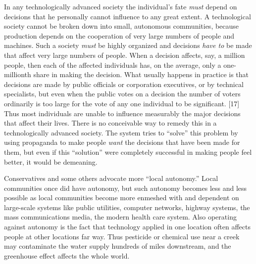  In any technologically advanced society the individual’s fate {\em must} depend on decisions that he personally cannot influence to any great extent. A technological society cannot be broken down into small, autonomous communities, because production depends on the cooperation of very large numbers of people and machines. Such a society {\em must} be highly organized and decisions {\em have to} be made that affect very large numbers of people. When a decision affects, say, a million people, then each of the affected individuals has, on the average, only a one-millionth share in making the decision. What usually happens in practice is that decisions are made by public officials or corporation executives, or by technical specialists, but even when the public votes on a decision the number of voters ordinarily is too large for the vote of any one individual to be significant. [17] Thus most individuals are unable to influence measurably the major decisions that affect their lives. There is no conceivable way to remedy this in a technologically advanced society. The system tries to “solve” this problem by using propaganda to make people {\em want} the decisions that have been made for them, but even if this “solution” were completely successful in making people feel better, it would be demeaning.

 Conservatives and some others advocate more “local autonomy.” Local communities once did have autonomy, but such autonomy becomes less and less possible as local communities become more enmeshed with and dependent on large-scale systems like public utilities, computer networks, highway systems, the mass communications media, the modern health care system. Also operating against autonomy is the fact that technology applied in one location often affects people at other locations far way. Thus pesticide or chemical use near a creek may contaminate the water supply hundreds of miles downstream, and the greenhouse effect affects the whole world.

